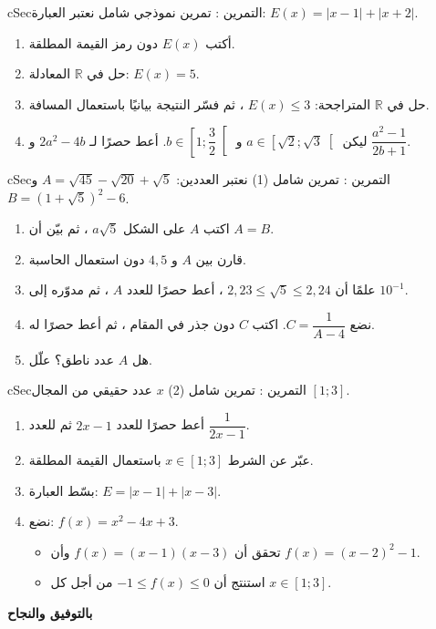 \documentclass[12pt,a4paper]{article}
\newenvironment{BOX}[2]{\begin{otherlanguage}{english}\begin{arbox}{#1}{#2}}{\end{arbox}\end{otherlanguage}}
\newcounter{exo}
\newenvironment{tamrin}[1]{\stepcounter{exo}\begin{BOX}{cSec}{التمرين \theexo: #1}}{\end{BOX}}
\newenvironment{LTR}{\begin{otherlanguage}{english}}{\end{otherlanguage}}
\newcommand{\R}{\mathbb{R}}
\newenvironment{sq}{\begin{itemize}[leftmargin=2.4em,itemsep=3pt]}{\end{itemize}}
\newcommand{\qa}{\item[(أ)]}\newcommand{\qb}{\item[(ب)]}\newcommand{\qc}{\item[(جـ)]}\newcommand{\qd}{\item[(د)]}\newcommand{\qe}{\item[(هـ)]}
\begin{document}
\begin{tamrin}{تمرين نموذجي شامل}
نعتبر العبارة: $E(x)=|x-1|+|x+2|$.
\begin{enumerate}
\item أكتب $E(x)$ دون رمز القيمة المطلقة.
\item حل في $\R$ المعادلة: $E(x)=5$.
\item حل في $\R$ المتراجحة: $E(x)\leqslant3$ ، ثم فسّر النتيجة بيانيًا باستعمال المسافة.
\item ليكن $a\in\left[\sqrt2;\sqrt3\right[$ و $b\in\left[1;\dfrac32\right[$. أعط حصرًا لـ $2a^2-4b$ و $\dfrac{a^2-1}{2b+1}$.
\end{enumerate}
\end{tamrin}

\begin{tamrin}{تمرين شامل (1)}
نعتبر العددين: $A=\sqrt{45}-\sqrt{20}+\sqrt5$ و $B=\left(1+\sqrt5\right)^2-6$.
\begin{enumerate}
\item اكتب $A$ على الشكل $a\sqrt5$ ، ثم بيّن أن $A=B$.
\item قارن بين $A$ و $4{,}5$ دون استعمال الحاسبة.
\item علمًا أن $2{,}23\leqslant\sqrt5\leqslant2{,}24$ ، أعط حصرًا للعدد $A$ ، ثم مدوّره إلى $10^{-1}$.
\item نضع $C=\dfrac1{A-4}$. اكتب $C$ دون جذر في المقام ، ثم أعط حصرًا له.
\item هل $A$ عدد ناطق؟ علّل.
\end{enumerate}
\end{tamrin}

\begin{tamrin}{تمرين شامل (2)}
$x$ عدد حقيقي من المجال $[1;3]$.
\begin{enumerate}
\item أعط حصرًا للعدد $2x-1$ ثم للعدد $\dfrac1{2x-1}$.
\item عبّر عن الشرط $x\in[1;3]$ باستعمال القيمة المطلقة.
\item بسّط العبارة: $E=|x-1|+|x-3|$.
\item نضع: $f(x)=x^2-4x+3$.
\begin{sq}
\qa تحقق أن $f(x)=(x-1)(x-3)$ وأن $f(x)=(x-2)^2-1$.
\qb استنتج أن $-1\leqslant f(x)\leqslant0$ من أجل كل $x\in[1;3]$.
\end{sq}
\end{enumerate}
\end{tamrin}

\begin{LTR}
\begin{tcolorbox}[enhanced,colback=cSec!10,colframe=cSec!40,arc=3mm,halign=center,boxrule=0.6pt,before upper={\selectlanguage{arabic}}]
{\color{cSec}\Large\bfseries بالتوفيق والنجاح}
\end{tcolorbox}
\end{LTR}
\end{document}
